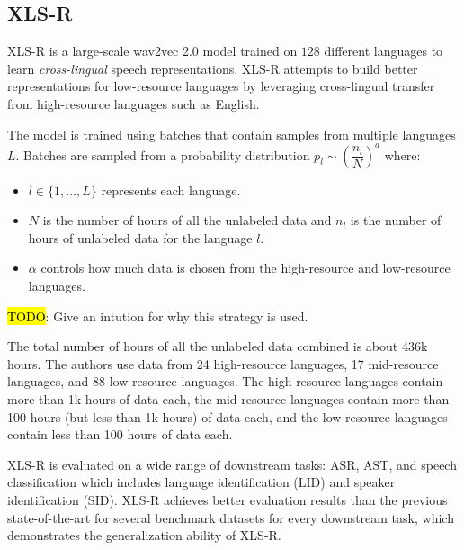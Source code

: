\subsection{XLS-R}
XLS-R \cite{babu2021xls} is a large-scale wav2vec 2.0 model trained on $128$ different languages to learn \emph{cross-lingual} speech representations.
XLS-R attempts to build better representations for low-resource languages by leveraging cross-lingual transfer from high-resource languages such as English.

The model is trained using batches that contain samples from multiple languages $L$. 
Batches are sampled from a probability distribution $p_l \sim \left(\dfrac{n_l}{N}\right)^{a}$ where:
\begin{itemize}
    \item $l \in \{1, \dots, L\}$ represents each language.
    \item $N$ is the number of hours of all the unlabeled data and $n_l$ is the number of hours of unlabeled data for the language $l$.
    \item $\alpha$ controls how much data is chosen from the high-resource and low-resource languages.
\end{itemize}
\hl{TODO}: Give an intution for why this strategy is used.

The total number of hours of all the unlabeled data combined is about 436k hours. The authors use data from 24 high-resource languages, 17 mid-resource languages, and 88 low-resource languages.
The high-resource languages contain more than 1k hours of data each, the mid-resource languages contain more than 100 hours (but less than 1k hours)
of data each, and the low-resource languages contain less than 100 hours of data each.

XLS-R is evaluated on a wide range of downstream tasks: ASR, AST, and speech classification which includes language identification (LID) and speaker identification (SID).
XLS-R achieves better evaluation results than the previous state-of-the-art for several benchmark datasets for every downstream task,
which demonstrates the generalization ability of XLS-R.